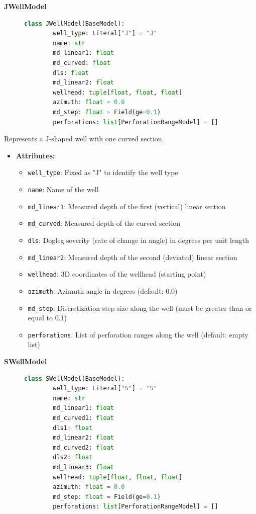 \textbf{JWellModel}
\begin{figure}[H]
	\begin{lstlisting}[language=Python, caption=JWellModel class definition]
		class JWellModel(BaseModel):
		well_type: Literal["J"] = "J"
		name: str
		md_linear1: float
		md_curved: float
		dls: float
		md_linear2: float
		wellhead: tuple[float, float, float]
		azimuth: float = 0.0
		md_step: float = Field(ge=0.1)
		perforations: list[PerforationRangeModel] = []
	\end{lstlisting}
\end{figure}

Represents a J-shaped well with one curved section.

\begin{itemize}
	\item \textbf{Attributes:}
	\begin{itemize}
		\item \texttt{well\_type}: Fixed as "J" to identify the well type
		\item \texttt{name}: Name of the well
		\item \texttt{md\_linear1}: Measured depth of the first (vertical) linear section
		\item \texttt{md\_curved}: Measured depth of the curved section
		\item \texttt{dls}: Dogleg severity (rate of change in angle) in degrees per unit length
		\item \texttt{md\_linear2}: Measured depth of the second (deviated) linear section
		\item \texttt{wellhead}: 3D coordinates of the wellhead (starting point)
		\item \texttt{azimuth}: Azimuth angle in degrees (default: 0.0)
		\item \texttt{md\_step}: Discretization step size along the well (must be greater than or equal to 0.1)
		\item \texttt{perforations}: List of perforation ranges along the well (default: empty list)
	\end{itemize}
\end{itemize}

\textbf{SWellModel}
\begin{figure}[H]
	\begin{lstlisting}[language=Python, caption=SWellModel class definition]
		class SWellModel(BaseModel):
		well_type: Literal["S"] = "S"
		name: str
		md_linear1: float
		md_curved1: float
		dls1: float
		md_linear2: float
		md_curved2: float
		dls2: float
		md_linear3: float
		wellhead: tuple[float, float, float]
		azimuth: float = 0.0
		md_step: float = Field(ge=0.1)
		perforations: list[PerforationRangeModel] = []
	\end{lstlisting}
\end{figure}

